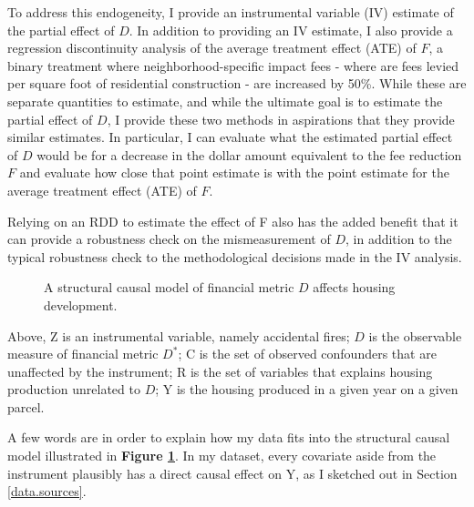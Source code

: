 \documentclass[a4paper,12pt]{article}
\begin{document}
To address this endogeneity, I provide an instrumental variable (IV) estimate of the partial effect of $D$. In addition to providing an IV estimate, I also provide a regression discontinuity analysis of the average treatment effect (ATE) of $F$, a binary treatment where neighborhood-specific impact fees - where are fees levied per square foot of residential construction - are increased by 50\%. While these are separate quantities to estimate, and while the ultimate goal is to estimate the partial effect of $D$, I provide these two methods in aspirations that they provide similar estimates. In particular, I can evaluate what the estimated partial effect of $D$ would be for a decrease in the dollar amount equivalent to the fee reduction $F$ and evaluate how close that point estimate is with the point estimate for the average treatment effect (ATE) of $F$.

Relying on an RDD to estimate the effect of F also has the added benefit that it can provide a robustness check on the mismeasurement of $D$, in addition to the typical robustness check to the methodological decisions made in the IV analysis.


\begin{figure}[hbt]
    \centering
    \caption{A structural causal model of financial metric $D$ affects housing development. }
    \label{fig:scm1}
\end{figure}

Above, Z is an instrumental variable, namely accidental fires; $D$ is the observable measure of financial metric $D^*$; C is the set of observed confounders that are unaffected by the instrument; R is the set of variables that explains housing production unrelated to $D$; Y is the housing produced in a given year on a given parcel.

A few words are in order to explain how my data fits into the structural causal model illustrated in \textbf{Figure \ref{fig:scm1}}. In my dataset, every covariate aside from the instrument plausibly has a direct causal effect on Y, as I sketched out in Section \ref{data.sources}. 
\end{document}
